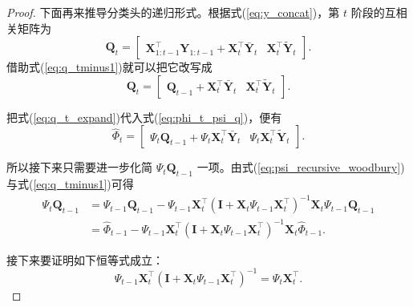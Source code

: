 \begin{proof}
下面再来推导分类头的递归形式。根据式(\ref{eq:y_concat})，第 $t$ 阶段的互相关矩阵为
\begin{equation}
\mathbf{Q}_t=
\begin{bmatrix}
\mathbf{X}_{1:t-1}^{\top}\mathbf{Y}_{1:t-1}+\mathbf{X}_t^{\top}\bar{\mathbf{Y}}_t
&
\mathbf{X}_t^{\top}\tilde{\mathbf{Y}}_t
\end{bmatrix}.
\label{eq:q_t_direct}
\end{equation}
借助式(\ref{eq:q_tminus1})就可以把它改写成
\begin{equation}
\mathbf{Q}_t=
\begin{bmatrix}
\mathbf{Q}_{t-1}+\mathbf{X}_t^{\top}\bar{\mathbf{Y}}_t
&
\mathbf{X}_t^{\top}\tilde{\mathbf{Y}}_t
\end{bmatrix}.
\label{eq:q_t_expand}
\end{equation}

把式(\ref{eq:q_t_expand})代入式(\ref{eq:phi_t_psi_q})，便有
\begin{equation}
\widehat{\Phi}_t=
\begin{bmatrix}
\Psi_t\mathbf{Q}_{t-1}+\Psi_t\mathbf{X}_t^{\top}\bar{\mathbf{Y}}_t
&
\Psi_t\mathbf{X}_t^{\top}\tilde{\mathbf{Y}}_t
\end{bmatrix}.
\label{eq:phi_t_intermediate}
\end{equation}

所以接下来只需要进一步化简 $\Psi_t\mathbf{Q}_{t-1}$ 一项。由式(\ref{eq:psi_recursive_woodbury})与式(\ref{eq:q_tminus1})可得
\begin{align}
\Psi_t\mathbf{Q}_{t-1}
&=\Psi_{t-1}\mathbf{Q}_{t-1}
-\Psi_{t-1}\mathbf{X}_t^{\top}
\left(\mathbf{I}+\mathbf{X}_t\Psi_{t-1}\mathbf{X}_t^{\top}\right)^{-1}
\mathbf{X}_t\Psi_{t-1}\mathbf{Q}_{t-1} \\
&=\widehat{\Phi}_{t-1}
-\Psi_{t-1}\mathbf{X}_t^{\top}
\left(\mathbf{I}+\mathbf{X}_t\Psi_{t-1}\mathbf{X}_t^{\top}\right)^{-1}
\mathbf{X}_t\widehat{\Phi}_{t-1}.
\label{eq:psi_q_simplify_1}
\end{align}

接下来要证明如下恒等式成立：
\begin{equation}
\Psi_{t-1}\mathbf{X}_t^{\top}
\left(\mathbf{I}+\mathbf{X}_t\Psi_{t-1}\mathbf{X}_t^{\top}\right)^{-1}
=\Psi_t\mathbf{X}_t^{\top}.
\label{eq:key_identity}
\end{equation}


\end{proof}
